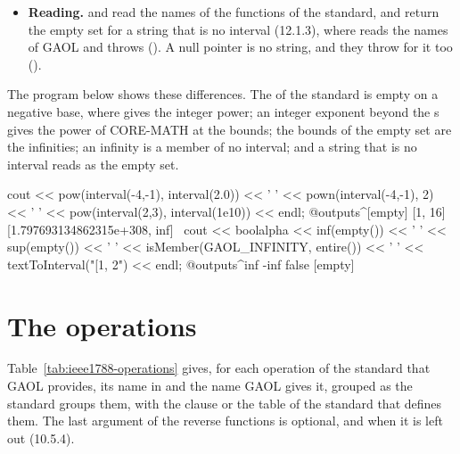 \begin{itemize}
   (13.3), whatever the output format that
   sets and the locale of the program.
   writes the current format instead, which is no
  literal in the formats  and , nor in the
  format  where the bounds share digits.\newinvfive
\item[$\bullet$] \textbf{Reading.}  and
   read the names of the functions of the standard,
  and return the empty set for a string that is no interval (12.1.3), where
   reads the names of GAOL and throws
  (). A null pointer is no string, and they throw
   for it too ().%
  \newinvfive
\end{itemize}

\begin{Ex}\label{ex:ieee1788-differences}
The program below shows these differences. The  of the standard is
empty on a negative base, where  gives the integer power; an
integer exponent beyond the s gives the power of CORE-MATH at the
bounds; the bounds of the empty set are the infinities; an infinity is a
member of no interval; and a string that is no interval reads as the empty
set.
\begin{example}
cout << pow(interval(-4,-1), interval(2.0)) << ' '
     << pown(interval(-4,-1), 2) << ' '
     << pow(interval(2,3), interval(1e10)) << endl;
@outputs^[empty] [1, 16] [1.797693134862315e+308, inf]~
cout << boolalpha << inf(empty()) << ' ' << sup(empty()) << ' '
     << isMember(GAOL_INFINITY, entire()) << ' '
     << textToInterval("[1, 2") << endl;
@outputs^inf -inf false [empty]~
\end{example}
\end{Ex}

\section{The operations}\label{sec:ieee1788-operations}
%

Table~\ref{tab:ieee1788-operations} gives, for each operation of the standard
that GAOL provides, its name in  and the name GAOL gives
it, grouped as the standard groups them, with the clause or the table of the
standard that defines them. The last argument of the reverse functions
is optional, and \itv{-\infty}{+\infty} when it is left out (10.5.4).


